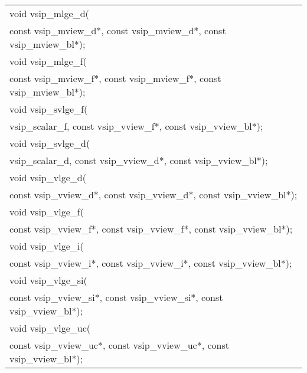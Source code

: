 \\\cvsiplh
\afh
{
\ttfamily
\\\hspace*{.04\textwidth}\begin{tabular}[H]{l}
void vsip\_mlge\_d(\\*\hspace{1cm}const vsip\_mview\_d*, const vsip\_mview\_d*, const vsip\_mview\_bl*);\\
void vsip\_mlge\_f(\\*\hspace{1cm}const vsip\_mview\_f*, const vsip\_mview\_f*, const vsip\_mview\_bl*);\\
void vsip\_svlge\_f(\\*\hspace{1cm}vsip\_scalar\_f, const vsip\_vview\_f*, const vsip\_vview\_bl*);\\
void vsip\_svlge\_d(\\*\hspace{1cm}vsip\_scalar\_d, const vsip\_vview\_d*, const vsip\_vview\_bl*);\\
void vsip\_vlge\_d(\\*\hspace{1cm}const vsip\_vview\_d*, const vsip\_vview\_d*, const vsip\_vview\_bl*);\\
void vsip\_vlge\_f(\\*\hspace{1cm}const vsip\_vview\_f*, const vsip\_vview\_f*, const vsip\_vview\_bl*);\\
void vsip\_vlge\_i(\\*\hspace{1cm}const vsip\_vview\_i*, const vsip\_vview\_i*, const vsip\_vview\_bl*);\\
void vsip\_vlge\_si(\\*\hspace{1cm}const vsip\_vview\_si*, const vsip\_vview\_si*, const vsip\_vview\_bl*);\\
void vsip\_vlge\_uc(\\*\hspace{1cm}const vsip\_vview\_uc*, const vsip\_vview\_uc*, const vsip\_vview\_bl*);\\
\end{tabular}
}
\\\pyjvsiph
{}
